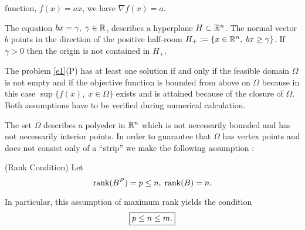 function, $f(x) = ax$, we have $\nabla f(x) = a$.
\par
The equation $bx = \gamma, \; \gamma \in \Bbb{R}$, describes a hyperplane $H
\subset \Bbb{R}^n$.  The normal vector $b$ points in the direction of the
positive half-room $H_+ := \{x \in \Bbb{R}^n, \; bx \geq \gamma\}$.  If $\gamma
> 0$ then the origin is not contained in $H_+$.
\par
The problem \ref{e1}(P) has at least one solution if and only if the feasible
domain $\Omega$ is not empty and if the objective function is bounded from
above on $\Omega$ because in this case $\sup \{f(x), \; x \in \Omega \}$ exists
and is attained because of the closure of $\Omega$.  Both assumptions have to
be verified during numerical calculation.
\par
The set $\Omega$ describes a polyeder in $\Bbb{R}^n$ which is not necessarily
bounded and has not necessarily interior points.  In order to guarantee that
$\Omega$ has vertex points and does not consist only of a ``strip'' we make the
following assumption :
%
\begin{assumption} \label{v1} (Rank Condition) Let
\[
\mathop{\rm rank}\nolimits (B^{{\cal P}}) = p \leq n, \; \mathop{\rm rank}\nolimits (B) = n.
\]
\end{assumption}
%
In particular, this assumption of maximum rank yields the condition
\[
\fbox{$
p \leq n \leq m.
$}
\]
